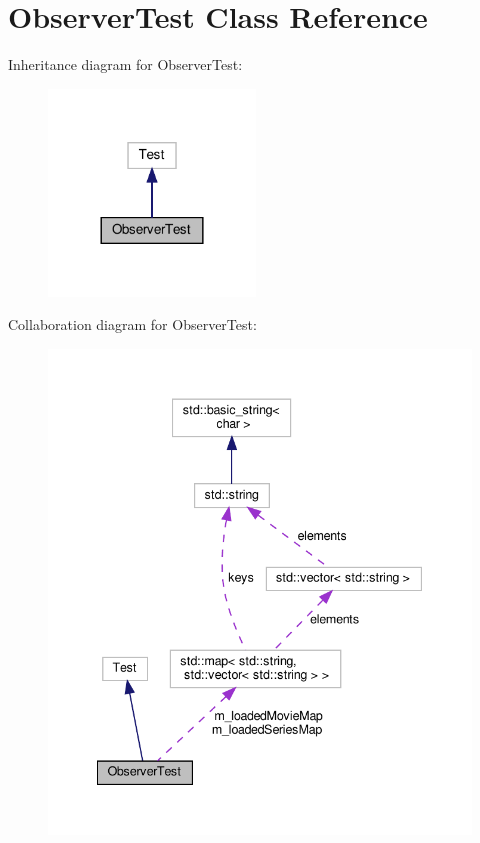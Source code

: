 \hypertarget{classObserverTest}{}\section{Observer\+Test Class Reference}
\label{classObserverTest}


Inheritance diagram for Observer\+Test\+:\nopagebreak
\begin{figure}[H]
\begin{center}
\leavevmode
\includegraphics[width=156pt]{classObserverTest__inherit__graph}
\end{center}
\end{figure}


Collaboration diagram for Observer\+Test\+:\nopagebreak
\begin{figure}[H]
\begin{center}
\leavevmode
\includegraphics[width=341pt]{classObserverTest__coll__graph}
\end{center}
\end{figure}

